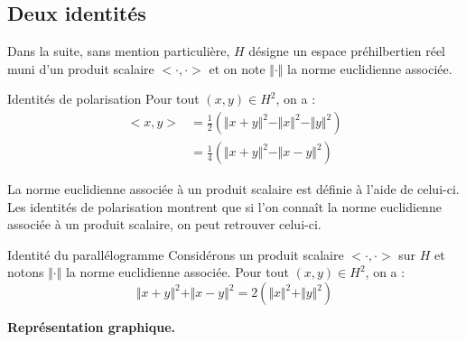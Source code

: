 \documentclass[french,11pt,twoside]{VcCours}
\begin{document}
\subsection{Deux identités}
Dans la suite, sans mention particulière, $H$ désigne un espace préhilbertien réel muni d'un produit scalaire $< \cdot , \cdot>$ et on note $\Vert \cdot \Vert$ la norme euclidienne associée.

\begin{Proposition}{Identités de polarisation} Pour tout $(x,y) \in H^2$, on a :
\begin{align*}
<x,y> & = \frac{1}{2} ( \Vert x+ y \Vert^2 - \Vert x \Vert^2 - \Vert y \Vert^2 )  \\
& = \frac{1}{4} ( \Vert x+y \Vert^2 - \Vert x-y \Vert^2) 
\end{align*}
\end{Proposition}

\begin{Demonstration}{} 

\vspace{6cm}
\end{Demonstration}

\begin{Remarque}{} La norme euclidienne associée à un produit scalaire est définie à l'aide de celui-ci. Les identités de polarisation montrent que si l'on connaît la norme euclidienne associée à un produit scalaire, on peut retrouver celui-ci.
\end{Remarque}

\begin{Proposition}{Identité du parallélogramme}
Considérons un produit scalaire $< \cdot , \cdot>$ sur $H$ et notons $\Vert \cdot \Vert$ la norme euclidienne associée. Pour tout $(x,y) \in H^2$, on a :
$$ \Vert x+y \Vert^2 + \Vert x-y \Vert^2 = 2 (\Vert x \Vert^2 + \Vert y \Vert^2)$$
\end{Proposition}

\newpage
\begin{center}
\textbf{Représentation graphique.}
\end{center}

\vspace{3cm}

\begin{Demonstration}{}

  \vspace{3cm}
\end{Demonstration}
\end{document}
